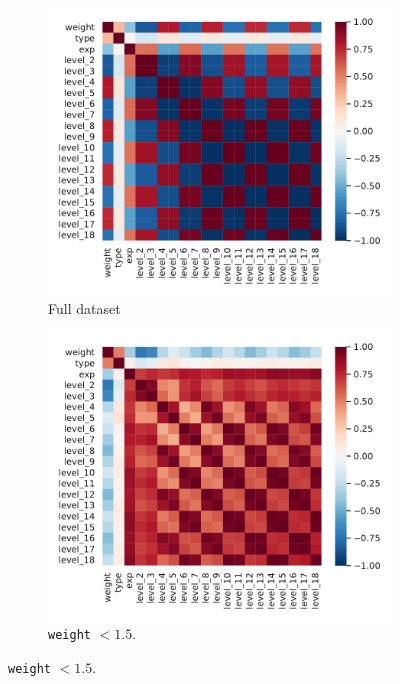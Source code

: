 \begin{figure}[htbp]
  \centering
  \begin{subfigure}{0.32\textwidth}
    \centering
    \includegraphics[width=\linewidth]{img/corr_mat_full}
    \caption{Full dataset}
  \end{subfigure}
  \begin{subfigure}{0.32\textwidth}
    \centering
    \includegraphics[width=\linewidth]{img/corr_mat_low}
    \caption{\texttt{weight} $< 1.5$.}
  \end{subfigure}

\end{figure}
